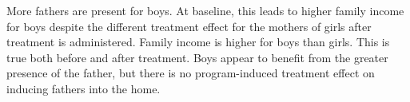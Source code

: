More fathers are present for boys. At baseline, this leads to higher family income for boys despite the different treatment effect for the mothers of girls after treatment is administered. Family income is higher for boys than girls. This is true both before and after treatment. Boys appear to benefit from the greater presence of the father, but there is no program-induced treatment effect on inducing fathers into the home.


